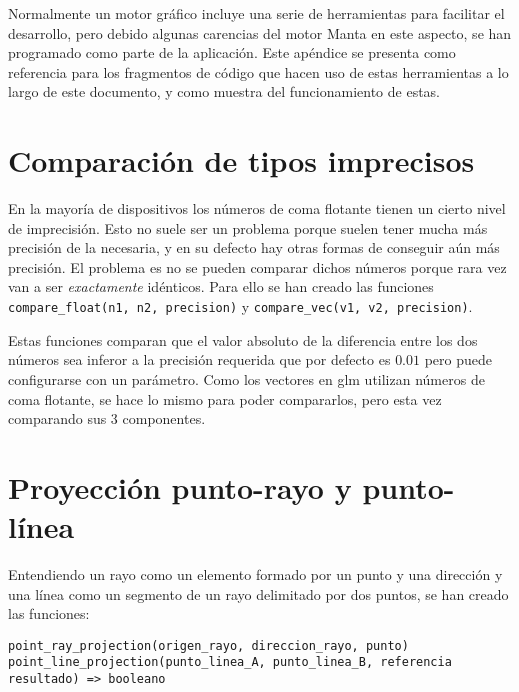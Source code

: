 Normalmente un motor gráfico incluye una serie de herramientas para facilitar el desarrollo, pero debido algunas carencias del motor Manta en este aspecto, se han programado como parte de la aplicación. Este apéndice se presenta como referencia para los fragmentos de código que hacen uso de estas herramientas a lo largo de este documento, y como muestra del funcionamiento de estas.

\section{Comparación de tipos imprecisos}
En la mayoría de dispositivos los números de coma flotante tienen un cierto nivel de imprecisión. Esto no suele ser un problema porque suelen tener mucha más precisión de la necesaria, y en su defecto hay otras formas de conseguir aún más precisión. El problema es no se pueden comparar dichos números porque rara vez van a ser \textit{exactamente} idénticos. Para ello se han creado las funciones \texttt{compare\_float(n1, n2, precision)} y \texttt{compare\_vec(v1, v2, precision)}.

Estas funciones comparan que el valor absoluto de la diferencia entre los dos números sea inferor a la precisión requerida que por defecto es $0.01$ pero puede configurarse con un parámetro. Como los vectores en glm utilizan números de coma flotante, se hace lo mismo para poder compararlos, pero esta vez comparando sus 3 componentes.

\section{Proyección punto-rayo y punto-línea}
\label{sec:pointrayproj}
Entendiendo un rayo como un elemento formado por un punto y una dirección y una línea como un segmento de un rayo delimitado por dos puntos, se han creado las funciones: 

\begin{lstlisting}
point_ray_projection(origen_rayo, direccion_rayo, punto)
point_line_projection(punto_linea_A, punto_linea_B, referencia resultado) => booleano
\end{lstlisting}

